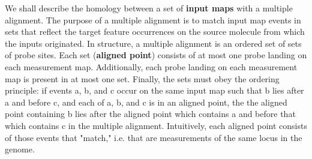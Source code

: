 \documentclass[11pt]{article}
\begin{document}
\par{
We shall describe the homology between a set of \textbf{input maps} with a multiple alignment.  The purpose of a multiple alignment is to match input map events in sets that reflect the target feature occurrences on the source molecule from which the inputs originated.  In structure, a multiple alignment is an ordered set of sets of probe sites. Each set (\textbf{aligned point}) consists of at most one probe landing on each measurement map.  Additionally, each probe landing on each measurement map is present in at most one set. Finally, the sets must obey the ordering principle: if events a, b, and c occur on the same input map such that b lies after a and before c, and each of a, b, and c is in an aligned point, the the aligned point containing b lies after the aligned point which contains a and before that which contains c in the multiple alignment.  Intuitively, each aligned point consists of those events that "match," i.e. that are measurements of the same locus in the genome.
}
\end{document}
